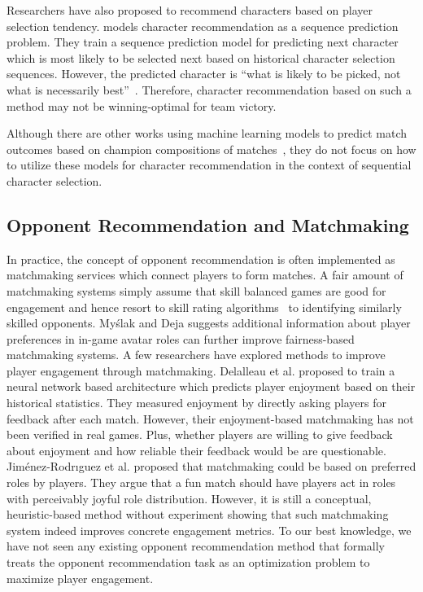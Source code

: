 
Researchers have also proposed to recommend characters based on player selection tendency. \cite{summerville2017reco} models character recommendation as a sequence prediction problem. They train a sequence prediction model for predicting next character which is most likely to be selected next based on historical character selection sequences. However, the predicted character is ``what is
likely to be picked, not what is necessarily best''~\cite{summerville2017reco}. Therefore, character recommendation based on such a method may not be winning-optimal for team victory.

Although there are other works using machine learning models to predict match outcomes based on champion compositions of matches~\cite{Yang:identifying,Semenov2016,wang2018outcome,wang2017outcome,zhengxing2016player}, they do not focus on how to utilize these models for character recommendation in the context of sequential character selection.


\subsection{Opponent Recommendation and Matchmaking}

In practice, the concept of opponent recommendation is often implemented as matchmaking services which connect players to form matches. A fair amount of matchmaking systems simply assume that skill balanced games are good for engagement \cite{graepel2006ranking,sweetser2005gameflow,flow1990psychology,chen2007flow} and hence resort to skill rating algorithms~\cite{glickman1999parameter,elo1978rating,herbrich:trueskill} to identifying similarly skilled opponents. My\'{s}lak and Deja \cite{myslak2014developing} suggests additional information about player preferences in in-game avatar roles can further improve fairness-based matchmaking systems. A few researchers have explored methods to improve player engagement through matchmaking. Delalleau et al. \cite{Delalleau2012} proposed to train a neural network based architecture which predicts player enjoyment based on their historical statistics. They measured enjoyment by directly asking players for feedback after each match. However, their enjoyment-based matchmaking has not been verified in real games. Plus, whether players are willing to give feedback about enjoyment and how reliable their feedback would be are questionable. Jim{\'e}nez-Rodr{\i}guez et al. \cite{jimenez2011matchmaking} proposed that matchmaking could be based on preferred roles by players. They argue that a fun match should have players act in  roles with perceivably joyful role distribution. However, it is still a conceptual, heuristic-based method without experiment showing that such matchmaking system indeed improves concrete engagement metrics. To our best knowledge, we have not seen any existing opponent recommendation method that formally treats the opponent recommendation task as an optimization problem to maximize player engagement. 

